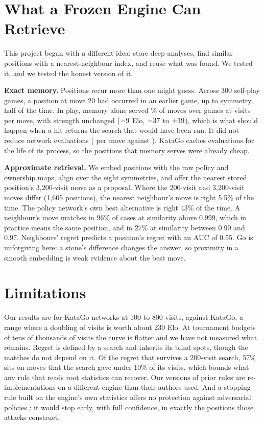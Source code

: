 \documentclass{article}
\begin{document}
\section{What a Frozen Engine Can Retrieve}
\label{sec:retrieval}

This project began with a different idea: store deep analyses, find similar positions with a nearest-neighbour index, and reuse what was found. We tested it, and we tested the honest version of it.

\textbf{Exact memory.} Positions recur more than one might guess. Across 300 self-play games, a position at move 20 had occurred in an earlier game, up to symmetry, half of the time. In play, memory alone served \memonlyHitRate\% of moves over \memonlyGames{} games at \memonlyVisits{} visits per move, with strength unchanged ($-9$ Elo, $-37$ to $+19$), which is what should happen when a hit returns the search that would have been run. It did not reduce network evaluations (\memonlyEvals{} per move against \memonlyBaseEvals). KataGo caches evaluations for the life of its process, so the positions that memory serves were already cheap.

\textbf{Approximate retrieval.} We embed positions with the raw policy and ownership maps, align over the eight symmetries, and offer the nearest stored position's 3{,}200-visit move as a proposal. Where the 200-visit and 3{,}200-visit moves differ (1{,}605 positions), the nearest neighbour's move is right 5.5\% of the time. The policy network's own best alternative is right 43\% of the time. A neighbour's move matches in 96\% of cases at similarity above 0.999, which in practice means the same position, and in 27\% at similarity between 0.90 and 0.97. Neighbours' regret predicts a position's regret with an AUC of 0.55. Go is unforgiving here: a stone's difference changes the answer, so proximity in a smooth embedding is weak evidence about the best move.

\section{Limitations}

Our results are for KataGo networks at 100 to 800 visits, against KataGo, a range where a doubling of visits is worth about 230 Elo. At tournament budgets of tens of thousands of visits the curve is flatter and we have not measured what remains. Regret is defined by a search and inherits its blind spots, though the matches do not depend on it. Of the regret that survives a 200-visit search, 57\% sits on moves that the search gave under 10\% of its visits, which bounds what any rule that reads root statistics can recover. Our versions of prior rules are re-implementations on a different engine than their authors used. And a stopping rule built on the engine's own statistics offers no protection against adversarial policies \cite{wang2023adversarial}: it would stop early, with full confidence, in exactly the positions those attacks construct.
\end{document}
